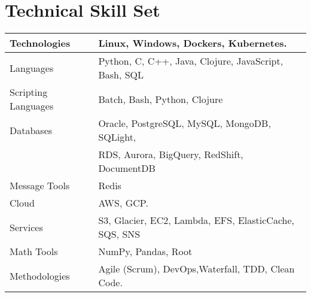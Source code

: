 \section{Technical Skill Set}

\begin{center}
  \begin{tabular}{|| l | l ||}
      \hline
      Technologies & Linux, Windows, Dockers, Kubernetes. \\
      \hline
      Languages & Python, C, C++, Java, Clojure, JavaScript, Bash, SQL \\
    \hline
      Scripting Languages \hspace{3mm} & Batch, Bash, Python, Clojure \\
    \hline
      Databases & Oracle, PostgreSQL, MySQL, MongoDB, SQLight, \\ & RDS, Aurora, BigQuery, RedShift, DocumentDB \\
    \hline
      Message Tools & Redis  \\
    \hline
      Cloud & AWS, GCP.  \\
    \hline
      Services & S3, Glacier, EC2, Lambda, EFS, ElasticCache, SQS, SNS \hspace{3mm} \\
    \hline
      Math Tools & NumPy, Pandas, Root \\
    \hline
      Methodologies & Agile (Scrum), DevOps,Waterfall, TDD, Clean Code. \\
    \hline
  \end{tabular}
\end{center}

